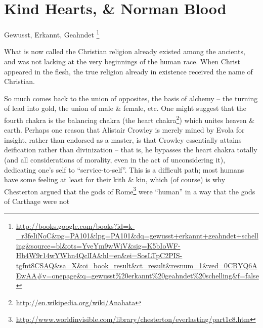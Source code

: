 \section{Kind Hearts, \& Norman Blood}

\begin{quotex}
Gewusst, Erkannt, Geahndet
\footnote{\url{http://books.google.com/books?id=k-\_r3feIiNoC&pg=PA101&lpg=PA101&dq=gewusst+erkannt+geahndet+schelling&source=bl&ots=YveYm9wWiV&sig=K5bIoWF-Hb4W9r14wYWhn4QclIA&hl=en&ei=SosLTpC2PIS-tgfnt8CSAQ&sa=X&oi=book\_result&ct=result&resnum=1&ved=0CBYQ6AEwAA\#v=onepage&q=gewusst\%20erkannt\%20geahndet\%20schelling&f=false}}

What is now called the Christian religion already existed among the ancients, and was not lacking at the very beginnings of the human race. When Christ appeared in the flesh, the true religion already in existence received the name of Christian.
\end{quotex}


So much comes back to the union of opposites, the basis of alchemy -- the turning of lead into gold, the union of male \& female, etc. One might suggest that the fourth chakra is the balancing chakra (the heart chakra\footnote{\url{http://en.wikipedia.org/wiki/Anahata}}) which unites heaven \& earth. Perhaps one reason that Alistair Crowley is merely mined by Evola for insight, rather than endorsed as a master, is that Crowley essentially attains deification rather than divinization -- that is, he bypasses the heart chakra totally (and all considerations of morality, even in the act of unconsidering it), dedicating one's self to ``service-to-self''. This is a difficult path; most humans have some feeling at least for their kith \& kin, which (of course) is why Chesterton argued that the gods of Rome\footnote{\url{http://www.worldinvisible.com/library/chesterton/everlasting/part1c8.htm}} were ``human'' in a way that the gods of Carthage were not

